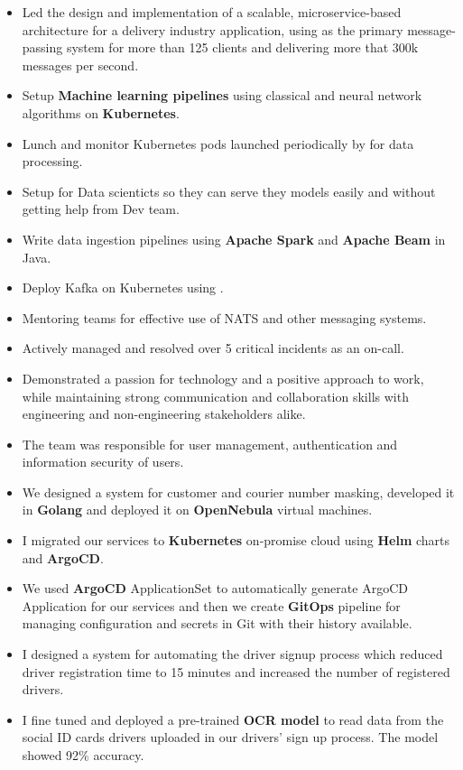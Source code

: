 \begin{itemize}
  \item Led the design and implementation of a scalable, microservice-based architecture for a delivery industry application,
    using  as the primary message-passing system for more than 125 clients and delivering
    more that 300k messages per second.
  \item Setup \textbf{Machine learning pipelines} using classical and neural network algorithms on \textbf{Kubernetes}.
  \item Lunch and monitor Kubernetes pods launched periodically by  for data processing.
  \item Setup  for Data scienticts so they can serve they models easily and without getting help from Dev team.
  \item Write data ingestion pipelines using \textbf{Apache Spark} and \textbf{Apache Beam} in Java.
  \item Deploy Kafka on Kubernetes using .
  \item Mentoring teams for effective use of NATS and other messaging systems.
  \item Actively managed and resolved over 5 critical incidents as an on-call.
  \item Demonstrated a passion for technology and a positive approach to work,
    while maintaining strong communication and collaboration skills with engineering
    and non-engineering stakeholders alike.
\end{itemize}

\vspace{0.5cm}

\begin{itemize}
  \item The team was responsible for user management, authentication and information security of users.
  \item We designed a system for customer and courier number masking, developed it in \textbf{Golang} and deployed it on \textbf{OpenNebula} virtual machines.
  \item I migrated our services to \textbf{Kubernetes} on‐promise cloud using \textbf{Helm} charts and \textbf{ArgoCD}.
  \item We used \textbf{ArgoCD} ApplicationSet to automatically generate ArgoCD Application for our services and then we create \textbf{GitOps} pipeline for managing configuration and secrets in Git with their history available.
  \item I designed a system for automating the driver signup process which reduced driver registration time to 15 minutes and increased the number of registered drivers.
  \item I fine tuned and deployed a pre-trained \textbf{OCR model} to read data from the social ID cards drivers uploaded in our drivers' sign up process. The model showed 92\% accuracy.
\end{itemize}


